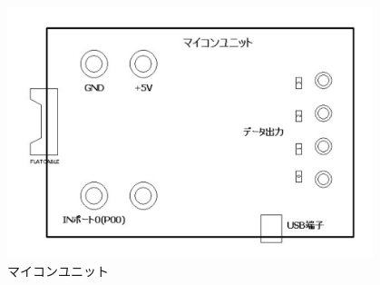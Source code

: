 \begin{figure}
    \begin{small}
        \begin{center}
            \includegraphics[width=0.95\textwidth]{src/figures/method/micom.png}
        \end{center}
        \caption{マイコンユニット}
        \label{fig:micom-unit}
    \end{small}
\end{figure}
